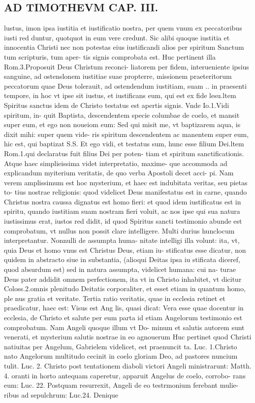 \documentclass{article}
\begin{document}
\begin{pages}
\section*{AD TIMOTHEVM CAP. III. }
\marginpar{[ p.89 ]}\pstart lustus, imon ipsa iustitia et iustificatio nostra, per quem vnum ex peccatoribus iusti red duntur, quotquot in eum vere credunt. Sic alibi quoque iustitia et innocentia Christi nec non potestas eius iustificandi alios per spiritum Sanctum tum scripturis, tum aper- tis signis comprobata est. Huc pertinent illa Rom.3.Proposuit Deus Christum reconci- liatorem per fidem, interueniente ipsius sanguine, ad ostenslonem iustitiae suae propterre, missionem praeteritorum peccatorum quae Deus tolerauit, ad ostendendum iustitiam, suam .. in praesenti tempore, in hoc vt ipse sit iustus, et iustificans eum, qui est ex fide lesu.ltem Spiritus sanctus idem de Christo testatus est apertis signis. Vnde Io.1.Vidi spiritum, in- quit Baptista, descendentem specie columbae de coelo, et mansit super eum, et ego non noueiom eum: Sed qui misit me, vt baptizarem aqua, is dixit mihi: super quem vide- ris spiritum descendentem ac manentem super eum, hic est, qui baptizat S.S. Et ego vidi, et testatus sum, hunc esse filium Dei.ltem Rom.1.qui declaratus fuit filius Dei per poten- tiam et spiritum sanctificationis. Atque haec simplieissima videt interpretatio, maxime- que accommoda ad explicandum myiterium veritatis, de quo verba Apostoli decet acci- pi. Nam verem amplissimum est hoc mysterium, et haec est indubitata veritas, seu pietas to- tius nostrae religionis: quod videlicet Deus manifestatus est in carne, quando Christus nostra caussa dignatus est homo fieri: et quod idem iustificatus est in spiritu, quando iustitiam suam nostram fieri voluit, ac nos ipse qui sua natura iustissimus erat, iustos red didit, id quod Spiritus sancti testimonio abunde est comprobatum, vt nullus non possit clare intelligere. Multi durius hunclocum interpretantur. Nonnulli de assumpta huma- nitate intelligi illa volunt: ita, vt, quia Deus et homo vnus est Christus Deus, etiam iu- stificatus esse dicatur, non quidem in abstracto siue in substantia, (alioqui Deitas ipsa iu stificata diceref, quod absurdum est) sed in natura assumpta, videlicet humana: cui na- turae Deus pater addidit omnem perfectionem, ita vt in Christo inhabitet, vt dicitur Coloss.2.omnis plenitudo Deitatis corporaliter, et esset etiam in quantum homo, ple nus gratia et veritate.  \pend\pstart Tertia ratio veritatis, quae in ecclesia retinet et praedicatur, haec est: Visus est Ang lis, quasi dicat: Vera esse quae docentur in ecclesia, de Christo et salute per eum parta id etiam Angelorum testimonio est comprobatum. Nam Angeli quoque illum vt Do- minum et salutis autorem sunt venerati, et mysterium salutis nostrae in eo agnouerum Huc pertinet quod Christi natiuitas per Angelum, Gabrielem videlicet, est praenuncit ta. Luc. 1.Christo nato Angelorum multitudo cecinit in coelo gloriam Deo, ad pastores nuncium tulit. Luc. 2. Christo post tentationem diaboli victori Angeli ministrarunt: Matth. 4. oranti in horto antequam caperetur, apparuit Angelus de coelo, corrobo- rans eum: Luc. 22. Postquam resurrexit, Angeli de eo testrmonium ferebant mulie- ribus ad sepulchrum: Luc.24. Denique 
\end{pages}
\end{document}
